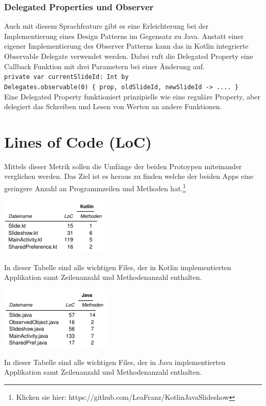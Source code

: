 \documentclass{sigchi-ext}
\begin{document}
\subsubsection{Delegated Properties und Observer}
Auch mit diesem Sprachfeature gibt es eine Erleichterung bei der Implementierung eines Design Patterns im Gegensatz zu Java. Anstatt einer eigener Implementierung des Observer Patterns kann das in Kotlin integrierte Observable Delegate verwendet werden. Dabei ruft die Delegated Property eine Callback Funktion mit drei Parametern bei einer Änderung auf. \\ \texttt{private var currentSlideId: Int by \\Delegates.observable(0) \{ prop, oldSlideId, newSlideId -> .... \}} \\ Eine Delegated Property funktioniert prinzipielle wie eine reguläre Property, aber delegiert das Schreiben und Lesen von Werten an andere Funktionen. \cite{delegates}

\section{Lines of Code (LoC)}
Mittels dieser Metrik sollen die Umfänge der beiden Protoypen miteinander verglichen werden. Das Ziel ist es heraus zu finden welche der beiden Apps eine geringere Anzahl an Programmzeilen und Methoden hat.\footnote{Klicken sie hier: https://github.com/LeaFranz/KotlinJavaSlideshow} 

\begin{marginfigure}[-20pc]
  \begin{minipage}{\marginparwidth}
    \centering
    \includegraphics[width=1.05\marginparwidth]{figures/Kotlin-Tabelle.png}
    \caption{In dieser Tabelle sind alle wichtigen Files, der in Kotlin implementierten Applikation samt Zeilenanzahl und Methodenanzahl enthalten.}
  \end{minipage}
\end{marginfigure}

\begin{marginfigure}[-3pc]
  \begin{minipage}{\marginparwidth}
    \centering
    \includegraphics[width=1.05\marginparwidth]{figures/Java-Tabelle.png}
    \caption{In dieser Tabelle sind alle wichtigen Files, der in Java implementierten Applikation samt Zeilenanzahl und Methodenanzahl enthalten. }
  \end{minipage}
\end{marginfigure}
\end{document}
